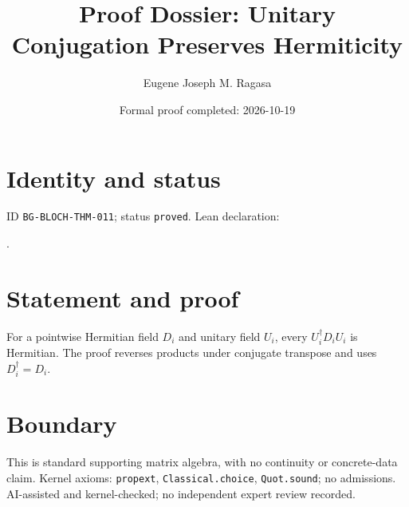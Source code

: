 \documentclass[11pt]{article}
\title{Proof Dossier: Unitary Conjugation Preserves Hermiticity}\author{Eugene Joseph M. Ragasa}\date{Formal proof completed: 2026-10-19}
\begin{document}
\maketitle
\section{Identity and status}
ID \texttt{BG-BLOCH-THM-011}; status \texttt{proved}. Lean declaration:
\par{}.
\section{Statement and proof}
For a pointwise Hermitian field $D_i$ and unitary field $U_i$, every
$U_i^\dagger D_iU_i$ is Hermitian. The proof reverses products under conjugate transpose
and uses $D_i^\dagger=D_i$.
\section{Boundary}
This is standard supporting matrix algebra, with no continuity or concrete-data claim.
Kernel axioms: \texttt{propext}, \texttt{Classical.choice}, \texttt{Quot.sound}; no
admissions. AI-assisted and kernel-checked; no independent expert review recorded.
\end{document}
